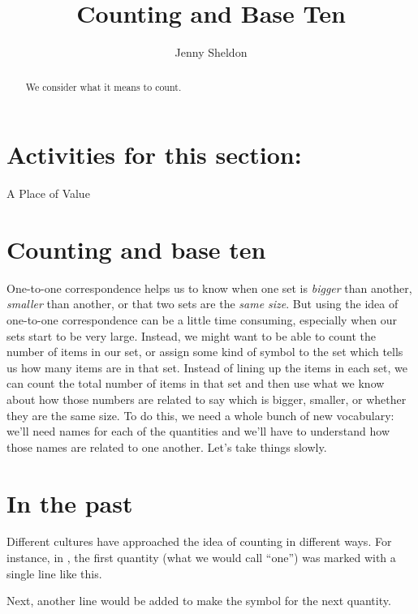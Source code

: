 \documentclass{ximera}
\title{Counting and Base Ten}
\author{Jenny Sheldon}
\begin{document}
\begin{abstract}
We consider what it means to count.
\end{abstract}
\maketitle

\section{Activities for this section:} A Place of Value


\section{Counting and base ten}

One-to-one correspondence helps us to know when one set is {\em bigger} than another, {\em smaller} than another, or that two sets are the {\em same size}. But using the idea of one-to-one correspondence can be a little time consuming, especially when our sets start to be very large. Instead, we might want to be able to count the number of items in our set, or assign some kind of symbol to the set which tells us how many items are in that set. Instead of lining up the items in each set, we can count the total number of items in that set and then use what we know about how those numbers are related to say which is bigger, smaller, or whether they are the same size. To do this, we need a whole bunch of new vocabulary: we'll need names for each of the quantities and we'll have to understand how those names are related to one another. Let's take things slowly.

\section{In the past} 

Different cultures have approached the idea of counting in different ways. For instance, in , the first quantity (what we would call ``one'') was marked with a single line like this.

\begin{center}
\textpmhg{\HZi}
\end{center}

Next, another line would be added to make the symbol for the next quantity.

\begin{center}
\textpmhg{\HZi\HZi}
\end{center}
\end{document}

